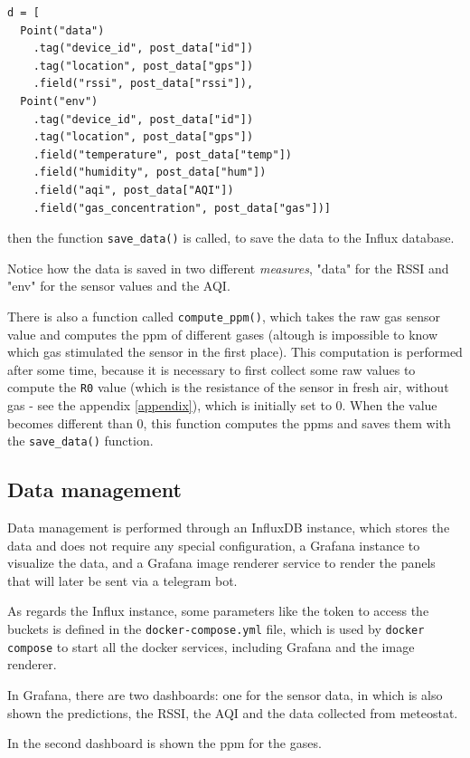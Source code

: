 \documentclass[]{article}
\begin{document}
\begin{lstlisting}[style=Python]
d = [
  Point("data")
    .tag("device_id", post_data["id"])
	.tag("location", post_data["gps"])
	.field("rssi", post_data["rssi"]),
  Point("env")
	.tag("device_id", post_data["id"])
	.tag("location", post_data["gps"])
	.field("temperature", post_data["temp"])
	.field("humidity", post_data["hum"])
	.field("aqi", post_data["AQI"])
	.field("gas_concentration", post_data["gas"])]
\end{lstlisting}

then the function \texttt{save\_data()} is called, to save the data to the Influx database. 

Notice how the data is saved in two different \textit{measures}, "data" for the RSSI and "env" for the sensor values and the AQI. 

There is also a function called \texttt{compute\_ppm()}, which takes the raw gas sensor value and computes the ppm of different gases (altough is impossible to know which gas stimulated the sensor in the first place). This computation is performed after some time, because it is necessary to first collect some raw values to compute the \texttt{R0} value (which is the resistance of the sensor in fresh air, without gas - see the appendix \ref{appendix}), which is initially set to 0. When the value becomes different than 0, this function computes the ppms and saves them with the \texttt{save\_data()} function. 

\subsection{Data management}

Data management is performed through an InfluxDB instance, which stores the data and does not require any special configuration, a Grafana instance to visualize the data, and a Grafana image renderer service to render the panels that will later be sent via a telegram bot. 

As regards the Influx instance, some parameters like the token to access the buckets is defined in the \texttt{docker-compose.yml} file, which is used by \texttt{docker compose} to start all the docker services, including Grafana and the image renderer.

In Grafana, there are two dashboards: one for the sensor data, in which is also shown the predictions, the RSSI, the AQI and the data collected from meteostat.

In the second dashboard is shown the ppm for the gases. 
\end{document}
